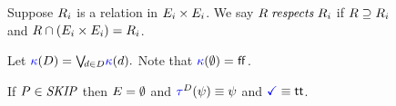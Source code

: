 \begin{figure}
  \raggedright
  
  \noindent
  Suppose $R_i$ is a relation in $E_i\times E_i$.
  We say $\aRel \rextendsdef{\aRel_i}{}$ if
  ${R}\supseteq {R_i}$ and
  $R\cap(E_i\times E_i) = R_i$.
  \medskip

  \noindent
  Let 
  \begin{math}
    \kappaE{\bEvs}=
    {\textstyle\bigvee{}\!\!{}_{\bEv\in\bEvs}\labelingForm(\bEv)}.
  \end{math}
  Note that $\kappaE{\emptyset} = \FALSE$.
  \medskip

  \noindent
  If $P\in\textnormal{\textit{SKIP}}$ then $E = \emptyset$
  and $\aTr{\bEvs}{\bForm} \riff \bForm$
  and $\aTerm\riff\TRUE$.
  \medskip


\end{figure}
